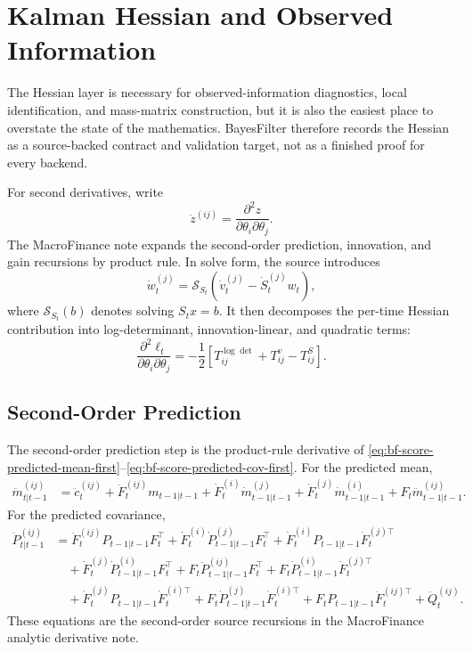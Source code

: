 \chapter{Kalman Hessian and Observed Information}
\label{ch:bf-kalman-hessian}

The Hessian layer is necessary for observed-information diagnostics, local
identification, and mass-matrix construction, but it is also the easiest place
to overstate the state of the mathematics.  BayesFilter therefore records the
Hessian as a source-backed contract and validation target, not as a finished
proof for every backend.

For second derivatives, write
\[
  \ddot z^{(ij)}
  =
  \frac{\partial^2 z}{\partial\theta_i\partial\theta_j}.
\]
The MacroFinance note expands the second-order prediction, innovation, and gain
recursions by product rule.  In solve form, the source introduces
\begin{equation}
\label{eq:bf-solve-hessian-w-dot}
  \dot w_t^{(j)}
  =
  \mathcal{S}_{S_t}\left(\dot v_t^{(j)}-\dot S_t^{(j)}w_t\right),
\end{equation}
where $\mathcal{S}_{S_t}(b)$ denotes solving $S_tx=b$.  It then decomposes the
per-time Hessian contribution into log-determinant, innovation-linear, and
quadratic terms:
\begin{equation}
\label{eq:bf-solve-hessian-summary}
  \frac{\partial^2\ell_t}{\partial\theta_i\partial\theta_j}
  =
  -\frac{1}{2}
  \left[
    T_{ij}^{\log\det}+T_{ij}^{v}-T_{ij}^{S}
  \right].
\end{equation}

\section{Second-Order Prediction}
\label{sec:bf-hessian-prediction}

The second-order prediction step is the product-rule derivative of
\eqref{eq:bf-score-predicted-mean-first}--\eqref{eq:bf-score-predicted-cov-first}.
For the predicted mean,
\begin{align}
\label{eq:bf-hessian-predicted-mean}
  \ddot m_{t|t-1}^{(ij)}
  &=
  \ddot c_t^{(ij)}
  +\ddot F_t^{(ij)}m_{t-1|t-1}
  +\dot F_t^{(i)}\dot m_{t-1|t-1}^{(j)}
  +\dot F_t^{(j)}\dot m_{t-1|t-1}^{(i)}
  +F_t\ddot m_{t-1|t-1}^{(ij)} .
\end{align}
For the predicted covariance,
\begin{align}
\label{eq:bf-hessian-predicted-cov}
  \ddot P_{t|t-1}^{(ij)}
  &=
  \ddot F_t^{(ij)}P_{t-1|t-1}F_t^\top
  +\dot F_t^{(i)}\dot P_{t-1|t-1}^{(j)}F_t^\top
  +\dot F_t^{(i)}P_{t-1|t-1}\dot F_t^{(j)\top} \nonumber\\
  &\quad
  +\dot F_t^{(j)}\dot P_{t-1|t-1}^{(i)}F_t^\top
  +F_t\ddot P_{t-1|t-1}^{(ij)}F_t^\top
  +F_t\dot P_{t-1|t-1}^{(i)}\dot F_t^{(j)\top} \nonumber\\
  &\quad
  +\dot F_t^{(j)}P_{t-1|t-1}\dot F_t^{(i)\top}
  +F_t\dot P_{t-1|t-1}^{(j)}\dot F_t^{(i)\top}
  +F_tP_{t-1|t-1}\ddot F_t^{(ij)\top}
  +\ddot Q_t^{(ij)} .
\end{align}
These equations are the second-order source recursions in the MacroFinance
analytic derivative note.

